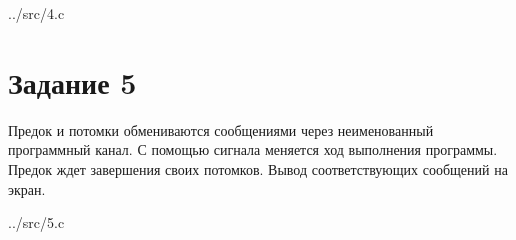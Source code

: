 \begin{lstinputlisting}[
	caption={pipe},
	style={go},
	]{../src/4.c}
\end{lstinputlisting}

\clearpage
{}
\bigskip

\section*{Задание 5}

Предок и потомки обмениваются сообщениями через неименованный
программный канал. С помощью сигнала меняется ход выполнения программы. Предок ждет завершения своих потомков. Вывод соответствующих сообщений на экран.

\begin{lstinputlisting}[
	caption={Сигналы},
	style={go},
	]{../src/5.c}
\end{lstinputlisting}


